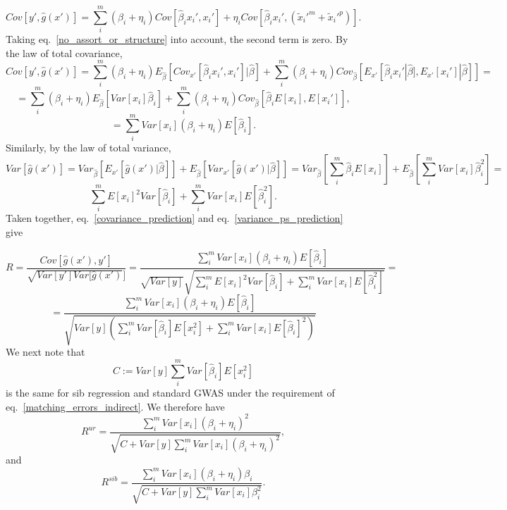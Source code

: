 \documentclass[hidelinks, 12pt]{article}
\begin{document}
$$ Cov[y',\hat{g}(x')]=\sum_i^m(\beta_i+\eta_i)Cov[\hat{\beta}_ix_i',x_i']+\eta_iCov[\hat{\beta}_ix_i',(\tilde{x}_i'^m+\tilde{x}_i'^p)].$$
Taking eq.~\ref{no_assort_or_structure} into account, the second term is zero.  By the law of total covariance,
$$ Cov[y',\hat{g}(x')]=\sum_i^m(\beta_i+\eta_i)E_{\hat{\beta}}[Cov_{x'}[\hat{\beta}_ix_i',x_i']|\hat{\beta}]+\sum_i^m(\beta_i+\eta_i)Cov_{\hat{\beta}}[E_{x'}[\hat{\beta}_ix_i'|\hat{\beta}],E_{x'}[x_i']|\hat{\beta}]]=$$
$$=\sum_i^m(\beta_i+\eta_i)E_{\hat{\beta}}[Var[x_i]\hat{\beta}_i]+\sum_i^m(\beta_i+\eta_i)Cov_{\hat{\beta}}[\hat{\beta}_iE[x_i],E[x_i']],$$
\begin{equation}
\label{covariance_prediction}
=\sum_i^mVar[x_i](\beta_i+\eta_i)E[\hat{\beta}_i].
\end{equation}
Similarly, by the law of total variance,
$$Var[\hat{g}(x')] =Var_{\hat{\beta}}[E_{x'}[\hat{g}(x')|\hat{\beta}]]+E_{\hat{\beta}}[Var_{x'}[\hat{g}(x')|\hat{\beta}]] = Var_{\hat{\beta}}[\sum_i^m\hat{\beta}_iE[x_i]]+E_{\hat{\beta}}[\sum_i^mVar[x_i]\hat{\beta}_i^2]=$$
\begin{equation}
\label{variance_ps_prediction}
\sum_i^mE[x_i]^2Var[\hat{\beta}_i]+\sum_i^mVar[x_i]E[\hat{\beta}_i^2].
\end{equation}
Taken together, eq.~\ref{covariance_prediction} and eq.~\ref{variance_ps_prediction} give

$$R = \frac{Cov[\hat{g}(x'),y']}{\sqrt{Var[y']Var[\hat{g}(x')}]}=\frac{\sum_i^mVar[x_i](\beta_i+\eta_i)E[\hat{\beta}_i]}{\sqrt{Var[y]}\sqrt{\sum_i^mE[x_i]^2Var[\hat{\beta}_i]+\sum_i^mVar[x_i]E[\hat{\beta}_i^2]}} =$$
\begin{equation}
\label{R_indirect_general_form}
=\frac{\sum_i^mVar[x_i](\beta_i+\eta_i)E[\hat{\beta}_i]}{\sqrt{Var[y](\sum_i^mVar[\hat{\beta}_i]E[x_i^2]+\sum_i^mVar[x_i]E[\hat{\beta}_i]^2)}}
\end{equation}
We next note that 
$$C:=Var[y]\sum_i^mVar[\hat{\beta}_i]E[x_i^2]$$
is the same for sib regression and standard GWAS under the requirement of eq.~\ref{matching_errors_indirect}.  We therefore have %
$$R^{ur} = \frac{\sum_i^mVar[x_i](\beta_i+\eta_i)^2}{\sqrt{C+ Var[y]\sum_i^mVar[x_i](\beta_i+\eta_i)^2}},$$
and
$$R^{sib} = \frac{\sum_i^mVar[x_i](\beta_i+\eta_i)\beta_i}{\sqrt{C+ Var[y]\sum_i^mVar[x_i]\beta_i^2}}.$$
\end{document}
